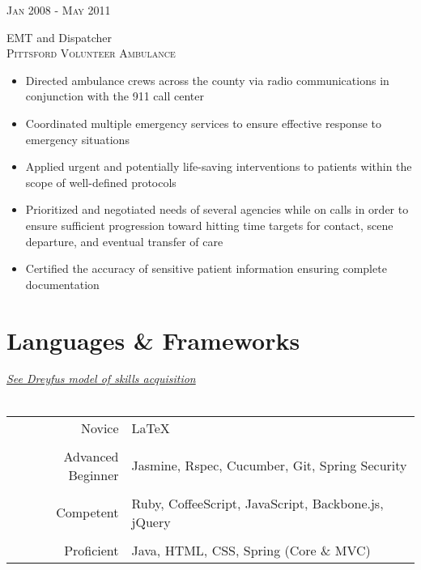 \documentclass[10pt]{article} %
\begin{document}
{\begin{minipage}[t]{0.5\textwidth}

{\raggedleft\textsc{Jan 2008 - May 2011}\par}

{\raggedright\large EMT and Dispatcher \\ \small\textsc{Pittsford Volunteer Ambulance}}
\begin{itemize}
  \item Directed ambulance crews across the county via radio communications in conjunction with the 911 call center
  \item Coordinated multiple emergency services to ensure effective response to emergency situations
  \item Applied urgent and potentially life-saving interventions to patients within the scope of well-defined protocols
  \item Prioritized and negotiated needs of several agencies while on calls in order to ensure sufficient progression toward hitting time targets for contact, scene departure, and eventual transfer of care
  \item Certified the accuracy of sensitive patient information ensuring complete documentation
\end{itemize}


\section{Languages \& Frameworks } 

{\scriptsize \href{http://en.wikipedia.org/wiki/Dreyfus_model_of_skill_acquisition}{\textit{See Dreyfus model of skills acquisition}}} \\ \\
\begin{tabularx}{\linewidth}{ r X }
Novice
& \LaTeX \\
\\
Advanced Beginner
& {Jasmine, Rspec, Cucumber, Git, Spring Security} \\
\\
Competent
& Ruby, CoffeeScript, JavaScript, Backbone.js, jQuery \\
\\
Proficient
& Java, HTML, CSS, Spring (Core \& MVC) \\
\end{tabularx}\\[10pt]



\end{minipage}}
\end{document}
